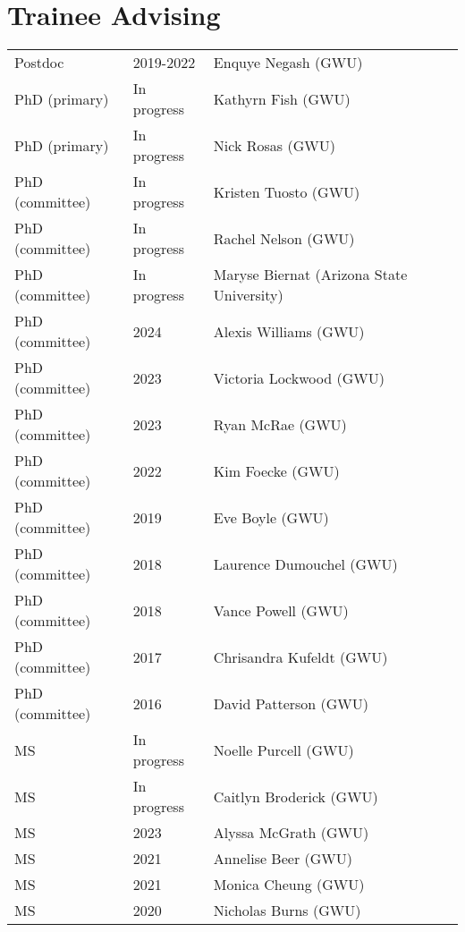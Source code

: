 \documentclass{article}
\begin{document}
\section*{Trainee Advising}
\begin{tabular}{p{}p{}p{}}
Postdoc & 2019-2022 & Enquye Negash (GWU)\\[4pt]
PhD (primary) & In progress & Kathyrn Fish (GWU)\\[4pt] %
PhD (primary) & In progress & Nick Rosas (GWU)\\[4pt] %
PhD (committee) & In progress & Kristen Tuosto (GWU)\\[4pt]
PhD (committee) & In progress & Rachel Nelson (GWU)\\[4pt]
PhD (committee) & In progress & Maryse Biernat (Arizona State University)\\[4pt]
PhD (committee) & 2024 & Alexis Williams (GWU)\\[4pt]
PhD (committee) & 2023 & Victoria Lockwood (GWU)\\[4pt]
PhD (committee) & 2023 & Ryan McRae (GWU)\\[4pt]
PhD (committee) & 2022 & Kim Foecke (GWU)\\[4pt]
PhD (committee) & 2019 & Eve Boyle (GWU)\\[4pt]
PhD (committee) & 2018 & Laurence Dumouchel (GWU)\\[4pt]
PhD (committee) & 2018 & Vance Powell (GWU)\\[4pt]
PhD (committee) & 2017 & Chrisandra Kufeldt (GWU)\\[4pt]
PhD (committee) & 2016 & David Patterson (GWU)\\

MS & In progress & Noelle Purcell (GWU)\\[4pt]%
MS & In progress & Caitlyn Broderick (GWU)\\[4pt]%
MS & 2023 & Alyssa McGrath (GWU)\\[4pt]%
MS & 2021 & Annelise Beer (GWU)\\[4pt]
MS & 2021 & Monica Cheung (GWU)\\[4pt]
MS & 2020 & Nicholas Burns (GWU)\\[4pt] %
\end{tabular}
\end{document}
